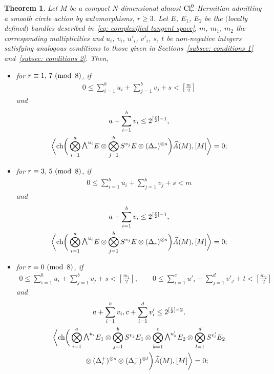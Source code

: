 \documentclass[10pt,a4paper]{amsart}
\newcommand{\A}{\mbox{$\widehat A$}}
\newcommand{\ext}{\raise1pt\hbox{$\textstyle\bigwedge$}}
\newcommand{\sym}{S}
\newcommand{\ch}{\mbox{\rm ch}}
\numberwithin{equation}{section}
\newtheorem{Theorem}{Theorem}[section]
\begin{document}
\begin{Theorem}\label{theo: vanishing 3} Let $M$ be a compact $N$-dimensional almost-${\rm Cl}_r^0$-Hermitian admitting a smooth circle action by automorphisms, $r\geq 3$. Let $E$, $E_1$, $E_2$ be the $($locally defined$)$ bundles described in~\eqref{eq: complexified tangent space}, $m$, $m_1$, $m_2$ the corresponding multiplicities and $u_i$, $v_i$, $u'_i$, $v'_i$, $s$, $t$ be non-negative integers satisfying analogous conditions to those given in Sections~{\rm \ref{subsec: conditions 1}} and~{\rm \ref{subsec: conditions 2}}. Then,
 \begin{itemize}\itemsep=0pt
\item for $r\equiv 1,\,7 \,\,({\rm mod\,\,\,} 8)$, if
 \begin{gather*}
 0\leq \sum_{i=1}^b u_i+\sum_{j=1}^b v_j+s<\left[\frac{m}{2}\right]
\end{gather*}
and
\begin{gather*}
 a + \sum_{i=1}^b v_i\leq 2^{[{r\over 2}]-1}, \\
 \bigg\langle \ch\bigg(\bigotimes_{i=1}^a\ext^{u_i}E\otimes \bigotimes_{j=1}^b\sym^{v_j} E\otimes (\Delta_r)^{\otimes s}\bigg)\A(M),[M]\bigg\rangle =0;\end{gather*}

\item for $r\equiv 3,\,5 \,\,({\rm mod\,\,\,} 8)$, if
 \begin{gather*}
 0\leq \sum_{i=1}^b u_i+\sum_{j=1}^b v_j+s<m
 \end{gather*}
 and
 \begin{gather*}
 a + \sum_{i=1}^b v_i\leq 2^{[{r\over 2}]-1}, \\
 \bigg\langle \ch\bigg(\bigotimes_{i=1}^a \ext^{u_i}E\otimes\bigotimes_{j=1}^b \sym^{v_j} E\otimes(\Delta_r)^{\otimes s}\bigg)\A(M),[M]\bigg\rangle =0;\end{gather*}

\item for $r\equiv 0 \,\,({\rm mod\,\,\,} 8)$, if
 \begin{gather*}
 0\leq \sum_{i=1}^b u_i+\sum_{j=1}^b v_j+s <\left[\frac{m_1}{2}\right], \qquad 0\leq \sum_{i=1}^c u'_i+\sum_{j=1}^d v'_j+t<\left[\frac{m_2}{2}\right]
 \end{gather*} and
 \begin{gather*}
 a + \sum_{i=1}^b v_i, c + \sum_{i=1}^d v'_i\leq 2^{[{r\over 2}]-2}, \\
 \bigg\langle \ch\bigg(\bigotimes_{i=1}^a\ext^{u_i}E_1\otimes\bigotimes_{j=1}^b\sym^{v_j} E_1 \otimes
 \bigotimes_{k=1}^c\ext^{u'_k}E_2\otimes\bigotimes_{l=1}^d\sym^{v'_l} E_2 \\
 \qquad{} \otimes (\Delta_r^+)^{\otimes s}\otimes(\Delta_r^-)^{\otimes t} \bigg)
 \A(M),[M]\bigg\rangle =0;\end{gather*}


\end{itemize}
\end{Theorem}
\end{document}
